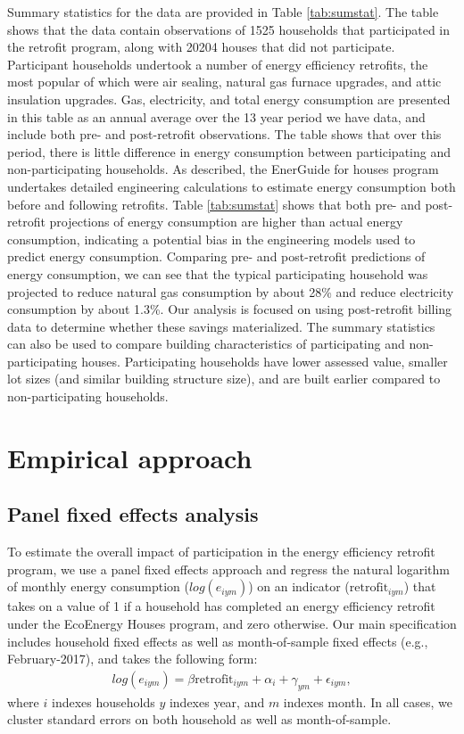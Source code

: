 \documentclass{article}
\begin{document}
Summary statistics for the data are provided in Table \ref{tab:sumstat}. The table shows that the data contain observations of 1525 households that participated in the retrofit program, along with 20204 houses that did not participate.  Participant households undertook a number of energy efficiency retrofits, the most popular of which were air sealing, natural gas furnace upgrades, and attic insulation upgrades.  Gas, electricity, and total energy consumption are presented in this table as an annual average over the 13 year period we have data, and include both pre- and post-retrofit observations. The table shows that over this period, there is little difference in energy consumption between participating and non-participating households. As described, the EnerGuide for houses program undertakes detailed engineering calculations to estimate energy consumption both before and following retrofits. Table \ref{tab:sumstat} shows that both pre- and post-retrofit projections of energy consumption are higher than actual energy consumption, indicating a potential bias in the engineering models used to predict energy consumption. Comparing pre- and post-retrofit predictions of energy consumption, we can see that the typical participating household was projected to reduce natural gas consumption by about 28\% and reduce electricity consumption by about 1.3\%. Our analysis is focused on using post-retrofit billing data to determine whether these savings materialized.  The summary statistics can also be used to compare building characteristics of participating and non-participating houses. Participating households have lower assessed value, smaller lot sizes (and similar building structure size), and are built earlier compared to non-participating households.





\section{Empirical approach}

\subsection{Panel fixed effects analysis}
To estimate the overall impact of participation in the energy efficiency retrofit program, we use a panel fixed effects approach and regress the natural logarithm of monthly energy consumption ($log(e_{iym})$) on an indicator ($\text{retrofit}_{iym}$) that takes on a value of 1 if a household has completed an energy efficiency retrofit under the EcoEnergy Houses program, and zero otherwise. Our main specification includes household fixed effects as well as month-of-sample fixed effects (e.g., February-2017), and takes the following form:
\begin{align}
	log(e_{iym}) = \beta \text{retrofit}_{iym} + \alpha_i + \gamma_{ym} + \epsilon_{iym},
	\label{eq:did}
\end{align}
where $i$ indexes households $y$ indexes year, and $m$ indexes month. In all cases, we cluster standard errors on both household as well as month-of-sample.
\end{document}
